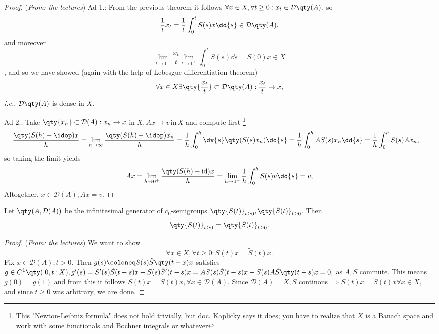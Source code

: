 \begin{proof}(\textit{From: the lectures})
	Ad 1.:
	From the previous theorem it follows $\forall x \in X, \forall t\geq0 :x_t \in \mathcal{D}\qty(A),$ so
	\[
	\frac{1}{t}x_t = \frac{1}{t}\int_0^t S(s)x \dd{s} \in \mathcal{D}\qty(A), 
	\]
	and moreover
	\[
		\lim_{t \to 0^+} \frac{x_t}{t} \lim_{t \to 0^+} \int_0^t S(s) \dd{s} = S(0) x \in X
	\]
	, and so we have showed (again with the help of Lebesgue differentiation theorem)
	\[
		\forall x \in X \exists \qty{\frac{x_t}{t}} \subset \mathcal{D}\qty(A): \frac{x_t}{t} \to x,
	\]
	\textit{i.e.}, $\mathcal{D}\qty(A)$ is dense in $X.$

	Ad 2.:
	Take $\qty{x_n} \subset \mathcal{D}(A): x_n \to x$ in $X, Ax \to v \, \text{in} \,X$ and compute first \footnote{This "Newton-Leibniz formula" does not hold trivially, but doc. Kaplicky says it does; you have to realize that $X$ is a Banach space and work with some functionals and Bochner integrals or whatever}
	\begin{align*}
		\frac{\qty(S(h) - \idop)x}{h} &= \lim_{n \to \infty} \frac{\qty(S(h) - \idop)x_n}{h}= \frac{1}{h}\int_0^h \dv{s}\qty(S(s)x_n)\dd{s} = \frac{1}{h}\int_0^h AS(s)x_n \dd{s} =\frac{1}{h}\int_0^h S(s)Ax_n, 
	\end{align*}
so taking the limit yields 
\[
	A x = \lim_{h \to 0^+}\frac{\qty(S(h)-\text{id})x}{h} =\lim_{h \to 0^+} \frac{1}{h}\int_0^h S(s)v \dd{s} = v,
\]
	Altogether, $x \in \mathcal{D}(A), Ax = v.$	
\end{proof}

\begin{lemma}
	Let $\qty(A, \mathcal{D}(A))$ be the infinitesimal generator of $c_0$-semigroups $\qty{S(t)}_{t\geq0}, \qty{\tilde{S}(t)}_{t\geq 0}.$ Then
	\[
		\qty{S(t)}_{t\geq 0} = \qty{\tilde{S}(t)}_{t \geq 0}.
	\]
\end{lemma}
\begin{proof}(\textit{From: the lectures})
    We want to show
    \[
	    \forall x \in X, \forall t\geq 0: S(t)x = \tilde{S}(t)x.
    \]
    Fix $x \in \mathcal{D}(A), t >0.$ Then $g(s) \coloneq S(s) \tilde{S}\qty(t-x)x$ satisfies $g \in C^1\qty([0,t];X), g'(s) = S'(s)\tilde{S}(t-s)x - S(s) \tilde{S}'(t-s)x = AS(s) \tilde{S}(t-s)x - S(s) A \tilde{S}\qty(t-s)x = 0,$ as $A,S$ commute. This means $g(0) = g(1)$ and from this it follows $S(t)x = \tilde{S}(t)x, \forall x \in \mathcal{D}(A).$ Since $\overline{\mathcal{D}(A)} = X, S$ continous $\Rightarrow S(t)x = \tilde{S}(t)x \forall x \in X, $ and since $t \geq 0$ was arbitrary, we are done.
\end{proof}

